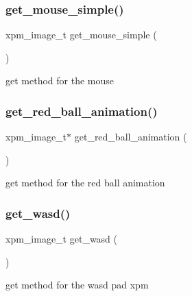 \mbox{\label{group__XPM_gaa1969bef6924610fa26b58c27926b3ee}} 
\subsubsection{\texorpdfstring{get\+\_\+mouse\+\_\+simple()}{get\_mouse\_simple()}}
{\footnotesize\ttfamily xpm\+\_\+image\+\_\+t get\+\_\+mouse\+\_\+simple (\begin{DoxyParamCaption}{ }\end{DoxyParamCaption})}



get method for the mouse 

\mbox{\label{group__XPM_ga8420f7ea3d894b635a6766e7a73ba288}} 
\subsubsection{\texorpdfstring{get\+\_\+red\+\_\+ball\+\_\+animation()}{get\_red\_ball\_animation()}}
{\footnotesize\ttfamily xpm\+\_\+image\+\_\+t$\ast$ get\+\_\+red\+\_\+ball\+\_\+animation (\begin{DoxyParamCaption}{ }\end{DoxyParamCaption})}



get method for the red ball animation 

\mbox{\label{group__XPM_ga8e0a9d2b45c84727a634b6aaf1be79f3}} 
\subsubsection{\texorpdfstring{get\+\_\+wasd()}{get\_wasd()}}
{\footnotesize\ttfamily xpm\+\_\+image\+\_\+t get\+\_\+wasd (\begin{DoxyParamCaption}{ }\end{DoxyParamCaption})}



get method for the wasd pad xpm 

